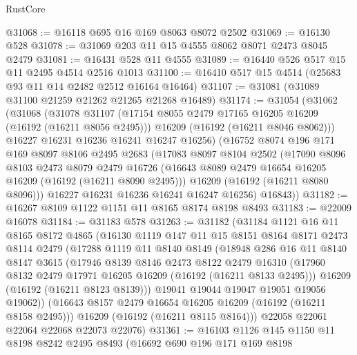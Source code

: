 \begin{lexlean}{RustCore}
\begin{coremodule}
@31068 := @16118 @695 @16 @169 @8063 @8072 @2502
@31069 := @16130 @528
@31078 := @31069 @203 @11 @15 @4555 @8062 @8071 @2473 @8045 @2479
@31081 := @16431 @528 @11 @4555
@31089 := @16440 @526 @517 @15 @11 @2495 @4514 @2516 @1013
@31100 := @16410 @517 @15 @4514 (@25683 @93 @11 @14 @2482 @2512 @16164 @16464)
@31107 := @31081 (@31089 @31100 @21259 @21262 @21265 @21268 @16489)
@31174 := @31054
    (@31062
      (@31068
        (@31078
          @31107
          (@17154 @8055 @2479 @17165 @16205 @16209 (@16192 (@16211 @8056 @2495)))
          @16209
          (@16192 (@16211 @8046 @8062)))
        @16227
        @16231
        @16236
        @16241
        @16247
        @16256)
      (@16752
        @8074
        @196
        @171
        @169
        @8097
        @8106
        @2495
        @2683
        (@17083
          @8097
          @8104
          @2502
          (@17090
            @8096
            @8103
            @2473
            @8079
            @2479
            @16726
            (@16643 @8089 @2479 @16654 @16205 @16209 (@16192 (@16211 @8090 @2495)))
            @16209
            (@16192 (@16211 @8080 @8096)))
          @16227
          @16231
          @16236
          @16241
          @16247
          @16256)
        @16843))
@31182 := @16267 @8109 @1122 @1151 @11 @8165 @8174 @8198 @8493
@31183 := @22009 @16078
@31184 := @31183 @578
@31263 := @31182
    (@31184
      @1121
      @16
      @11
      @8165
      @8172
      @4865
      (@16130
        @1119
        @147
        @11
        @15
        @8151
        @8164
        @8171
        @2473
        @8114
        @2479
        (@17288
          @1119
          @11
          @8140
          @8149
          (@18948
            @286
            @16
            @11
            @8140
            @8147
            @3615
            (@17946
              @8139
              @8146
              @2473
              @8122
              @2479
              @16310
              (@17960 @8132 @2479 @17971 @16205 @16209 (@16192 (@16211 @8133 @2495)))
              @16209
              (@16192 (@16211 @8123 @8139)))
            @19041
            @19044
            @19047
            @19051
            @19056
            @19062))
        (@16643 @8157 @2479 @16654 @16205 @16209 (@16192 (@16211 @8158 @2495)))
        @16209
        (@16192 (@16211 @8115 @8164)))
      @22058
      @22061
      @22064
      @22068
      @22073
      @22076)
@31361 := @16103
    @1126
    @145
    @1150
    @11
    @8198
    @8242
    @2495
    @8493
    (@16692
      @690
      @196
      @171
      @169
      @8198

\end{coremodule}
\end{lexlean}
